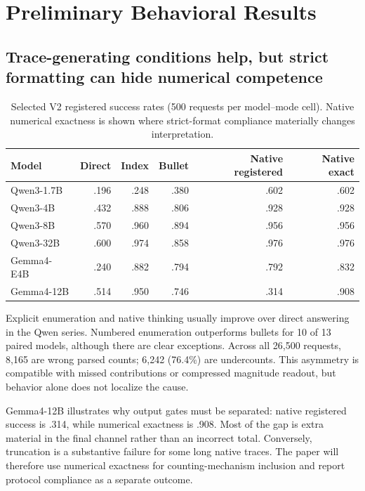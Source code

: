 \documentclass[11pt]{article}
\begin{document}
\section{Preliminary Behavioral Results}
\label{sec:behavior}

\subsection{Trace-generating conditions help, but strict formatting can hide numerical competence}

\begin{table}[H]
\centering
\caption{Selected V2 registered success rates (500 requests per model--mode cell). Native numerical exactness is shown where strict-format compliance materially changes interpretation.}
\label{tab:behavior}
\begin{tabular}{@{}lrrrrr@{}}
\toprule
Model & Direct & Index & Bullet & Native registered & Native exact \\
\midrule
Qwen3-1.7B & .196 & .248 & .380 & .602 & .602 \\
Qwen3-4B   & .432 & .888 & .806 & .928 & .928 \\
Qwen3-8B   & .570 & .960 & .894 & .956 & .956 \\
Qwen3-32B  & .600 & .974 & .858 & .976 & .976 \\
Gemma4-E4B & .240 & .882 & .794 & .792 & .832 \\
Gemma4-12B & .514 & .950 & .746 & .314 & .908 \\
\bottomrule
\end{tabular}
\end{table}

Explicit enumeration and native thinking usually improve over direct answering in the Qwen series. Numbered enumeration outperforms bullets for 10 of 13 paired models, although there are clear exceptions. Across all 26,500 requests, 8,165 are wrong parsed counts; 6,242 (76.4\%) are undercounts. This asymmetry is compatible with missed contributions or compressed magnitude readout, but behavior alone does not localize the cause.

Gemma4-12B illustrates why output gates must be separated: native registered success is .314, while numerical exactness is .908. Most of the gap is extra material in the final channel rather than an incorrect total. Conversely, truncation is a substantive failure for some long native traces. The paper will therefore use numerical exactness for counting-mechanism inclusion and report protocol compliance as a separate outcome.
\end{document}
